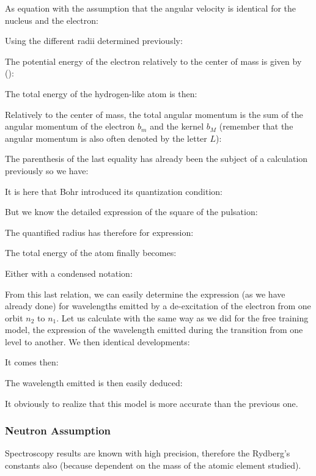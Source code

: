As equation with the assumption that the angular velocity is identical for the nucleus and the electron:
	
Using the different radii determined previously:
	
The potential energy of the electron relatively to the center of mass is given by ():
	
The total energy of the hydrogen-like atom is then:
	

Relatively to the center of mass, the total angular momentum is the sum of the angular momentum of the electron $b_m$ and the kernel $b_M$ (remember that the angular momentum is also often denoted by the letter $L$):
	
The parenthesis of the last equality has already been the subject of a calculation previously so we have:
	
It is here that Bohr introduced its quantization condition:
	
	But we know the detailed expression of the square of the pulsation:
	
	The  quantified radius has therefore for expression:
		
	The total energy of the atom finally becomes:
		
		Either with a condensed notation:
		
From this last relation, we can easily determine the expression (as we have already done) for wavelengths emitted by a de-excitation of the electron from one orbit $n_2$ to $n_1$. Let us calculate with the same way as we did for the free training model, the expression of the wavelength emitted during the transition from one level to another. We then identical developments:
		
It comes then:
		
The wavelength emitted is then easily deduced:
		

	\begin{tcolorbox}[title=Remark,colframe=black,arc=10pt]
It obviously to realize that this model is more accurate than the previous one.
	\end{tcolorbox}	
	
	\subsubsection{Neutron Assumption}

Spectroscopy results are known with high precision, therefore the Rydberg's constants also (because dependent on the mass of the atomic element studied).

